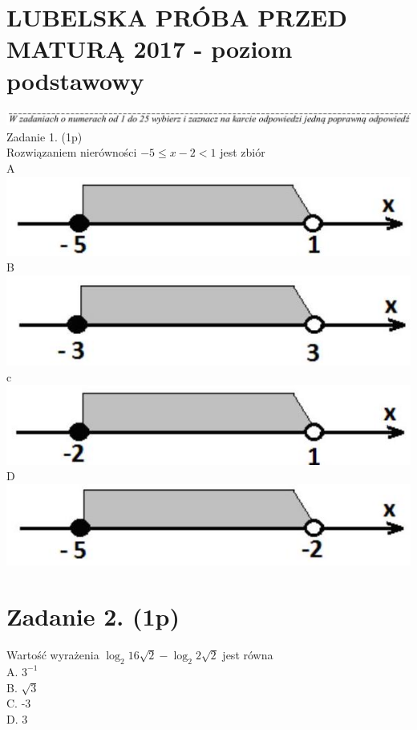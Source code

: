 \documentclass[10pt]{article}
\begin{document}
\section*{LUBELSKA PRÓBA PRZED MATURĄ 2017 - poziom podstawowy}
\includegraphics[max width=\textwidth, center]{2024_11_21_d45b0573b36a3462565cg-02(3)}\\
Zadanie 1. (1p)\\
Rozwiązaniem nierówności \(-5 \leq x-2<1\) jest zbiór\\
A\\
\includegraphics[max width=\textwidth, center]{2024_11_21_d45b0573b36a3462565cg-02(4)}\\
B\\
\includegraphics[max width=\textwidth, center]{2024_11_21_d45b0573b36a3462565cg-02}\\
c\\
\includegraphics[max width=\textwidth, center]{2024_11_21_d45b0573b36a3462565cg-02(2)}\\
D\\
\includegraphics[max width=\textwidth, center]{2024_11_21_d45b0573b36a3462565cg-02(1)}

\section*{Zadanie 2. (1p)}
Wartość wyrażenia \(\log _{2} 16 \sqrt{2}-\log _{2} 2 \sqrt{2}\) jest równa\\
A. \(3^{-1}\)\\
B. \(\sqrt{3}\)\\
C. -3\\
D. 3
\end{document}
